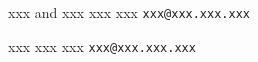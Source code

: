 



\References


\Address
xxx and xxx
xxx
xxx
{\tt xxx@xxx.xxx.xxx}


\Address
xxx
xxx
xxx
{\tt xxx@xxx.xxx.xxx}

\bye
